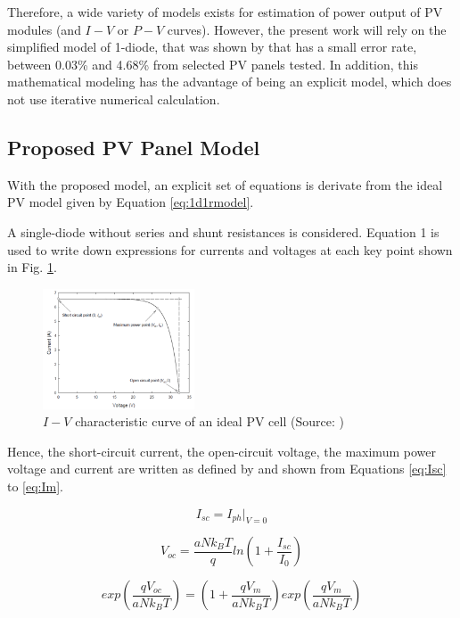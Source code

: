 \documentclass[journal]{IEEEtran}
\begin{document}
Therefore, a wide variety of models exists for estimation of power output of PV modules (and $I-V$ or $P-V$ curves). However, the present work will rely on the simplified model of 1-diode, that was shown by \cite{Saloux} that has a small error rate, between 0.03\% and 4.68\% from selected PV panels tested. In addition, this mathematical modeling has the advantage of being an explicit model, which does not use iterative numerical calculation. 
 
\subsection{Proposed PV Panel Model}
With the proposed model, an explicit set of equations is derivate from the ideal PV model given by Equation \ref{eq:1d1rmodel}.

A single-diode without series and shunt resistances is considered. Equation 1 is
used to write down expressions for currents and voltages at each key point shown in
Fig. \ref{fig:ivcurve}.

\begin{figure}[h]
\includegraphics[width=0.4\textwidth]{ivcurve}
\centering
\caption{$ I-V $ characteristic curve of an ideal PV cell (Source: \cite{Saloux})}
\label{fig:ivcurve}
\end{figure}

Hence, the short-circuit current, the open-circuit voltage, the maximum power voltage and current are written as defined by \cite{Saloux} and shown from Equations \ref{eq:Isc} to \ref{eq:Im}.

\begin{equation}
\label{eq:Isc}
I_{sc}=I_{ph}\vert_{V=0}
\end{equation}

\begin{equation}
\label{eq:Voc}
V_{oc}=\dfrac{aNk_{B}T}{q}ln\left( 1+\dfrac{I_{sc}}{I_{0}} \right) 
\end{equation}

\begin{equation}
\label{eq:exp}
exp\left( \dfrac{qV_{oc}}{aNk_{B}T} \right) = \left(1+\dfrac{qV_{m}}{aNk_{B}T} \right) exp \left( \dfrac{qV_{m}}{aNk_{B}T} \right) 
\end{equation}
\end{document}
